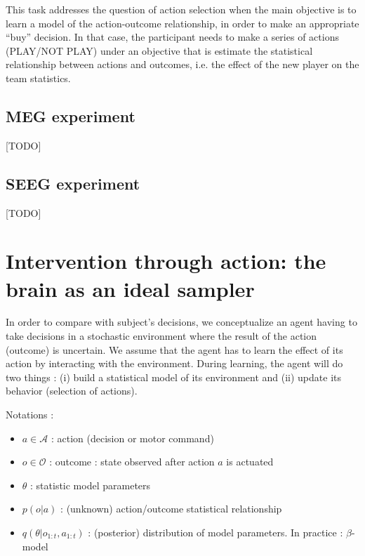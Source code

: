 \documentclass[10pt,letterpaper]{article}
\begin{document}
This task addresses the question of action selection when the main objective is to learn a model of the action-outcome relationship, in order to make an appropriate ``buy'' decision. In that case, the participant needs to make a series of actions (PLAY/NOT PLAY) under an objective that is estimate the statistical relationship between actions and outcomes, i.e. the effect of the new player on the team statistics.

\subsection{MEG experiment}
{\color{blue}  [TODO] }
\subsection{SEEG experiment}
{\color{blue}  [TODO] }


\section{Intervention through action: the brain as an ideal sampler}

In order to compare with subject's decisions, we conceptualize an agent having to take decisions in a stochastic environment where the result of the action (outcome) is uncertain.
We assume that the agent has to learn the effect of its action by interacting with the environment. During learning, the agent will do two things : (i) build a statistical model of its environment and (ii) update its behavior (selection of actions). 


Notations :
\begin{itemize}
    \item $a \in \mathcal{A}$ : action (decision or motor command)
    \item $o \in \mathcal{O}$ : outcome : state observed after action $a$ is actuated
    \item $\theta$ : statistic model parameters %
    \item $p(o|a)$ : (unknown) action/outcome statistical relationship
    \item $q(\theta|o_{1:t},a_{1:t})$ : (posterior) distribution of model parameters. In practice : $\beta$-model 
\end{itemize}
\end{document}
